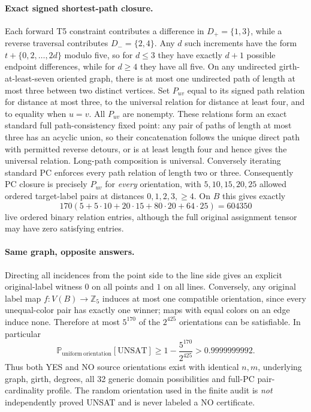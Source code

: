 \documentclass[11pt]{article}
\begin{document}
\paragraph{Exact signed shortest-path closure.}
Each forward T5 constraint contributes a difference in
$D_+=\{1,3\}$, while a reverse traversal contributes
$D_-=\{2,4\}$. Any $d$ such increments have the form
$t+\{0,2,\ldots,2d\}$ modulo five, so for $d\leq3$
they have exactly $d+1$ possible endpoint differences, while
for $d\geq4$ they have all five. On any undirected girth-at-least-seven
oriented graph, there is at most one undirected path of length
at most three between two distinct vertices. Set $P_{uv}$
equal to its signed path relation for distance at most three,
to the universal relation for distance at least four,
and to equality when $u=v$. All $P_{uv}$ are nonempty.
These relations form an exact standard full
path-consistency fixed point: any pair of paths of length at
most three has an acyclic union, so their concatenation follows
the unique direct path with permitted reverse detours,
or is at least length four and hence gives the universal
relation. Long-path composition is universal. Conversely
iterating standard PC enforces every path relation of length
two or three. Consequently PC closure is precisely $P_{uv}$
for \emph{every} orientation, with $5,10,15,20,25$ allowed
ordered target-label pairs at distances $0,1,2,3,\geq4$.
On $B$ this gives exactly
\[
170(5+5\cdot10+20\cdot15+80\cdot20+64\cdot25)
=\boxed{604350}
\]
live ordered binary relation entries, although the full original
assignment tensor may have zero satisfying entries.

\paragraph{Same graph, opposite answers.}
Directing all incidences from the point side to the line side
gives an explicit original-label witness $0$ on all points
and $1$ on all lines. Conversely, any original label map
$f:V(B)\to\mathbb Z_5$ induces at most one compatible
orientation, since every unequal-color pair has exactly one
winner; maps with equal colors on an edge induce none.
Therefore at most $5^{170}$ of the $2^{425}$ orientations
can be satisfiable. In particular
\[
\mathbb P_{\mathrm{uniform\ orientation}}[\mathrm{UNSAT}]
\geq 1-\frac{5^{170}}{2^{425}}
>0.9999999992.
\]
Thus both YES and NO source orientations exist with identical
$n,m$, underlying graph, girth, degrees, all 32 generic domain
possibilities and full-PC pair-cardinality profile.
The random orientation used in the finite audit is
\emph{not} independently proved UNSAT and is never labeled
a NO certificate.
\end{document}
